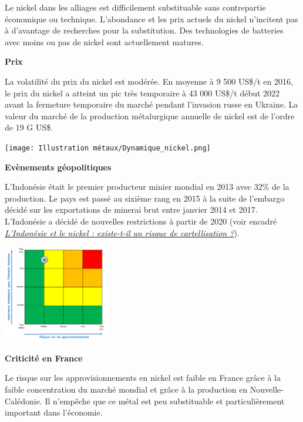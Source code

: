 Le nickel dans les alliages est difficilement substituable sans contrepartie économique ou technique. L'abondance
et les prix actuels du nickel n'incitent pas à d'avantage de recherches pour la substitution. Des technologies
de batteries avec moins ou pas de nickel sont actuellement matures. 
\begin{center}
    \textbf{Prix}
\end{center}
La volatilité du prix du nickel est modérée. En moyenne à 9 500 US\$/t en 2016, le prix du nickel a atteint un pic très temporaire
à 43 000 US\$/t début 2022 avant la fermeture temporaire du marché pendant l'invasion russe en Ukraine. La valeur du marché de la production métalurgique annuelle de nickel est de l'ordre de 19 G US\$.

\clearpage
\begin{center}
\texttt{[image: Illustration métaux/Dynamique\_nickel.png]}
\end{center}
\begin{center}
    \textbf{Evènements géopolitiques}
\end{center}
L'Indonésie était le premier producteur minier mondial en 2013 avec 32\% de la production. Le pays est passé au sixième rang en 2015 à la suite de l'embargo décidé sur les exportations de minerai brut entre janvier 2014 et 2017. L'Indonésie a décidé de nouvelles restrictions à partir de 2020 (voir encadré \hyperref[Indonesia]{\textit{L’Indonésie et le nickel : existe-t-il un risque de cartellisation ?}}). 

\begin{multicols}{2}
    \includegraphics[width=0.35\textwidth]{Illustration métaux/Nickel_criticité.png}
    \begin{center}
    \textbf{Criticité en France}
    \end{center}
    Le risque sur les approvisionnements en nickel est faible en France grâce à la faible concentration
    du marché mondial et grâce à la production en Nouvelle-Calédonie. Il n'empêche que ce métal est peu substituable
    et particulièrement important dans l'économie.
\end{multicols}

